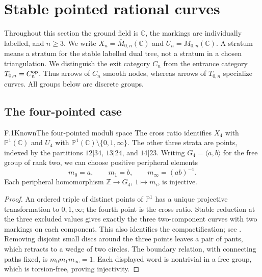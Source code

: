 \section{Stable pointed rational curves}
\label{sec:F}

Throughout this section the ground field is $\mathbb C$, the markings are
individually labelled, and $n\geq3$.  We write $X_n=\overline M_{0,n}(\mathbb
C)$ and $U_n=M_{0,n}(\mathbb C)$.  A stratum means a stratum for the stable
labelled dual tree, not a stratum in a chosen triangulation.  We distinguish
the exit category $C_n$ from the entrance category $T_{0,n}=C_n^{\mathrm{op}}$.
Thus arrows of $C_n$ smooth nodes, whereas arrows of $T_{0,n}$ specialize
curves.  All groups below are discrete groups.

\subsection{The four-pointed case}

\begin{statement}{F.1}{Known}{The four-pointed moduli space}
The cross ratio identifies $X_4$ with $\mathbb P^1(\mathbb C)$ and $U_4$
with $\mathbb P^1(\mathbb C)\setminus\{0,1,\infty\}$.  The other three
strata are points, indexed by the partitions $12|34$, $13|24$, and $14|23$.
Writing $G_4=\langle a,b\rangle$ for the free group of rank two, we can
choose positive peripheral elements
\[
 m_0=a,\qquad m_1=b,\qquad m_\infty=(ab)^{-1}.
\]
Each peripheral homomorphism $\mathbb Z\longrightarrow G_4$, $1\mapsto
m_i$, is injective.
\end{statement}
\begin{proof}
An ordered triple of distinct points of $\mathbb P^1$ has a unique
projective transformation to $0,1,\infty$; the fourth point is the cross
ratio.  Stable reduction at the three excluded values gives exactly the
three two-component curves with two markings on each component.  This
also identifies the compactification; see \citet[Catalogue, Facts 1--2,
pp.~551--552]{FKeel1992}.  Removing disjoint small discs around the three
points leaves a pair of pants, which retracts to a wedge of two circles.
The boundary relation, with connecting paths fixed, is
$m_0m_1m_\infty=1$.  Each displayed word is nontrivial in a free group,
which is torsion-free, proving injectivity.
\end{proof}

